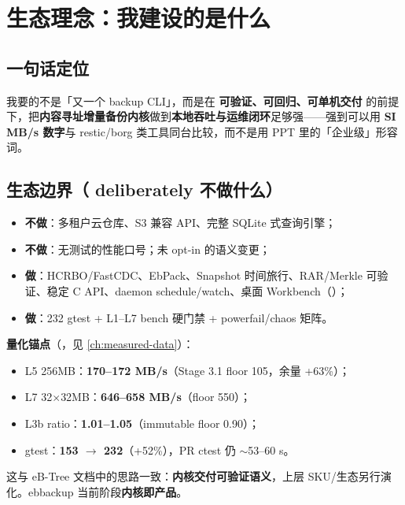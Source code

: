 \chapter{生态理念：我建设的是什么}
\label{ch:philosophy}

\section{一句话定位}

我要的不是「又一个 backup CLI」，而是在 \textbf{可验证、可回归、可单机交付} 的前提下，把\textbf{内容寻址增量备份内核}做到\textbf{本地吞吐与运维闭环}足够强——强到可以用 \textbf{SI MB/s 数字}与 restic/borg 类工具同台比较，而不是用 PPT 里的「企业级」形容词。

\section{生态边界（ deliberately 不做什么）}

\begin{philobox}[产品边界 = 生态边界]
\begin{itemize}
  \item \textbf{不做}：多租户云仓库、S3 兼容 API、完整 SQLite 式查询引擎；
  \item \textbf{不做}：无测试的性能口号；未 opt-in 的语义变更；
  \item \textbf{做}：HCRBO/FastCDC、EbPack、Snapshot 时间旅行、RAR/Merkle 可验证、稳定 C API、daemon schedule/watch、桌面 Workbench（）；
  \item \textbf{做}：232 gtest + L1--L7 bench 硬门禁 + powerfail/chaos 矩阵。
\end{itemize}
\end{philobox}

\textbf{量化锚点}（，见 \cref{ch:measured-data}）：
\begin{itemize}[nosep]
  \item L5 256MB：\textbf{170--172 MB/s}（Stage 3.1 floor 105，余量 +63\%）；
  \item L7 32$\times$32MB：\textbf{646--658 MB/s}（floor 550）；
  \item L3b ratio：\textbf{1.01--1.05}（immutable floor 0.90）；
  \item gtest：\textbf{153 $\rightarrow$ 232}（+52\%），PR ctest 仍 $\sim$53--60 s。
\end{itemize}

这与 eB-Tree 文档中的思路一致：\textbf{内核交付可验证语义}，上层 SKU/生态另行演化。ebbackup 当前阶段\textbf{内核即产品}。

